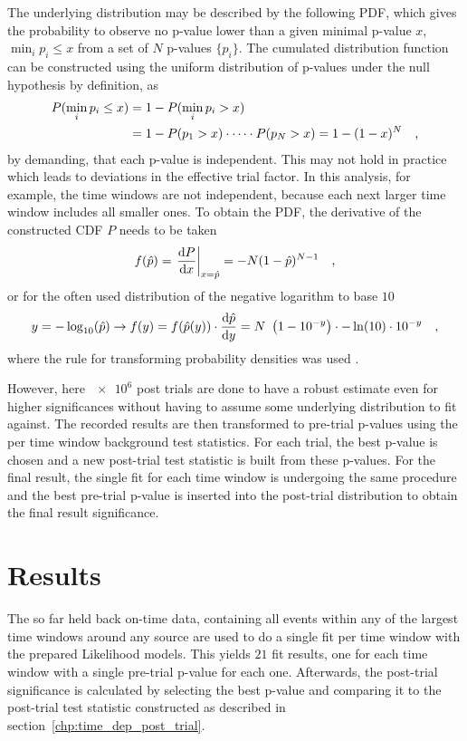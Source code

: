 The underlying distribution may be described by the following PDF, which gives the probability to observe no p-value lower than a given minimal p-value $x$, $\min_i{p_i} \leq x$ from a set of $N$ p-values $\{p_i\}$.
The cumulated distribution function can be constructed using the uniform distribution of p-values under the null hypothesis by definition, as
\begin{align}
  P(\min_i{p_i} \leq x)
  &= 1 - P(\min_i{p_i} > x) \\
  &= 1 - P(p_1 > x)\cdot\dots\cdot P(p_N > x)
  = 1 - (1-x)^N
  \quad\text{,}
\end{align}
by demanding, that each p-value is independent.
This may not hold in practice which leads to deviations in the effective trial factor.
In this analysis, for example, the time windows are not independent, because each next larger time window includes all smaller ones.
To obtain the PDF, the derivative of the constructed CDF $P$ needs to be taken
\begin{equation}
  f(\hat{p})
  = \left. \frac{\mathrm{d}P}{\mathrm{d}x} \right|_{x=\hat{p}}
  = -N(1 - \hat{p})^{N-1}
  \quad\text{,}
\end{equation}
or for the often used distribution of the negative logarithm to base $\num{10}$
\begin{equation}
  y = -\log_{10}(\hat{p})
  \rightarrow
  f(y) = f(\hat{p}(y))\cdot\dd{\hat{p}}{y}
  = N \left( 1 - 10^{-y} \right) \cdot -\ln(10)\cdot 10^{-y}
  \mcomma
\end{equation}
where the rule for transforming probability densities was used \cite{blobel2013statistische}.

However, here $\num{e6}$ post trials are done to have a robust estimate even for higher significances without having to assume some underlying distribution to fit against.
The recorded results are then transformed to pre-trial p-values using the per time window background test statistics.
For each trial, the best p-value is chosen and a new post-trial test statistic is built from these p-values.
For the final result, the single fit for each time window is undergoing the same procedure and the best pre-trial p-value is inserted into the post-trial distribution to obtain the final result significance.

\section{Results}
The so far held back on-time data, containing all events within any of the largest time windows around any source are used to do a single fit per time window with the prepared Likelihood models.
This yields $\num{21}$ fit results, one for each time window with a single pre-trial p-value for each one.
Afterwards, the post-trial significance is calculated by selecting the best p-value and comparing it to the post-trial test statistic constructed as described in section~\ref{chp:time_dep_post_trial}.

